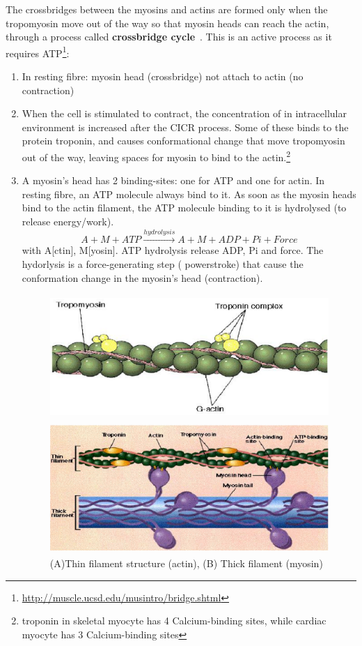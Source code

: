 The crossbridges between the myosins and actins are formed only when
the tropomyosin move out of the way so that myosin heads can reach the
actin, through a process called
{\bf crossbridge cycle}~\cite{chin2006msm}. This is an active process
as it requires ATP\footnote{\url{http://muscle.ucsd.edu/musintro/bridge.shtml}}:
\begin{enumerate}
\item In resting fibre: myosin head (crossbridge) not attach to actin
  (no contraction)

\item When the cell is stimulated to contract, the concentration of
   in intracellular environment is increased after the CICR
  process. Some of these  binds to the protein troponin, and
  causes conformational change that move tropomyosin out of the way,
  leaving spaces for myosin to bind to the actin.\footnote{troponin in
    skeletal myocyte has 4 Calcium-binding sites, while cardiac
    myocyte has 3 Calcium-binding sites}
\item A myosin's head has 2 binding-sites: one for ATP and one for
  actin. In resting fibre, an ATP molecule always bind to it.  As soon
  as the myosin heads bind to the actin filament, the ATP molecule
  binding to it is hydrolysed (to release energy/work). 
  \begin{equation}
    \label{eq:131}
    A + M + ATP \xrightarrow{hydrolysis} A + M + ADP + Pi + Force
  \end{equation}
  with A[ctin], M[yosin]. ATP hydrolysis release ADP, Pi and
  force. The hydorlysis is a force-generating step ( powerstroke) that
  cause the conformation change in the myosin's head (contraction).
\begin{figure}[hbt]
 \centerline{\includegraphics[height=4.7cm,
   angle=0]{./images/thin_filament.eps}}
 \centerline{\includegraphics[height=5cm,
   angle=0]{./images/thick_filament.eps}
}
\caption{(A)Thin filament structure (actin), (B) Thick filament (myosin)}
\label{fig:actin_myosin}
\end{figure}


\end{enumerate}
